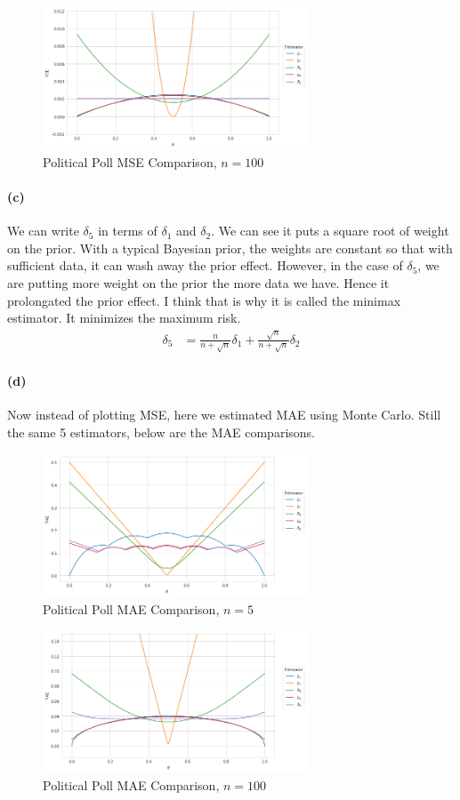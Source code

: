 \documentclass[11pt, letterpaper]{article}
\begin{document}
\begin{figure}[!h]
  \centering
  \includegraphics[width=0.7\textwidth]{3.b.2.png}
  \captionsetup{justification=centering}
  \caption{Political Poll MSE Comparison, $n = 100$}
\end{figure}

\paragraph{(c)}
We can write $\delta_5$ in terms of $\delta_1$ and $\delta_2$. We can see it puts a square root of weight on the prior. With a typical Bayesian prior, the weights are constant so that with sufficient data, it can wash away the prior effect. However, in the case of $\delta_5$, we are putting more weight on the prior the more data we have. Hence it prolongated the prior effect. I think that is why it is called the minimax estimator. It minimizes the maximum risk.
\begin{align*}
    \delta_5 &= \frac{n}{n + \sqrt{n}} \delta_1 + \frac{\sqrt{n}}{n+\sqrt{n}} \delta_2
\end{align*}

\paragraph{(d)}
Now instead of plotting MSE, here we estimated MAE using Monte Carlo. Still the same 5 estimators, below are the MAE comparisons.
\begin{figure}[!h]
  \centering
  \includegraphics[width=0.7\textwidth]{3.d.1.png}
  \captionsetup{justification=centering}
  \caption{Political Poll MAE Comparison, $n = 5$}
\end{figure}

\begin{figure}[!h]
  \centering
  \includegraphics[width=0.7\textwidth]{3.d.2.png}
  \captionsetup{justification=centering}
  \caption{Political Poll MAE Comparison, $n = 100$}
\end{figure}
\end{document}
